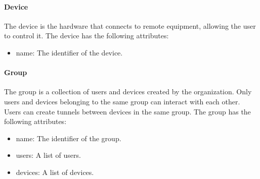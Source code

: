 \paragraph{Device}
The device is the hardware that connects to remote equipment, allowing the user to control it.
The device has the following attributes:
\begin{itemize}
    \item name: The identifier of the device.
\end{itemize}
    
\paragraph{Group}
The group is a collection of users and devices created by the organization.
Only users and devices belonging to the same group can interact with each other.
Users can create tunnels between devices in the same group.
The group has the following attributes:
\begin{itemize}
    \item name: The identifier of the group.
    \item users: A list of users.
    \item devices: A list of devices.
\end{itemize}
